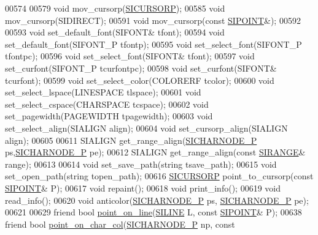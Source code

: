 \begin{DoxyCode}
00574 
00579     \textcolor{keywordtype}{void} mov\_cursorp(\hyperlink{class_s_i_c_h_a_r_n_o_d_e}{SICURSORP});   
00585     \textcolor{keywordtype}{void} mov\_cursorp(SIDIRECT);
00591     \textcolor{keywordtype}{void} mov\_cursorp(\textcolor{keyword}{const} \hyperlink{struct_s_i_p_o_i_n_t}{SIPOINT}&);
00592     
00593     \textcolor{keywordtype}{void} set\_default\_font(SIFONT& tfont);   
00594     \textcolor{keywordtype}{void} set\_default\_font(SIFONT\_P tfontp); 
00595     \textcolor{keywordtype}{void} set\_select\_font(SIFONT\_P tfontpc); 
00596     \textcolor{keywordtype}{void} set\_select\_font(SIFONT& tfont);    
00597     \textcolor{keywordtype}{void} set\_curfont(SIFONT\_P tcurfontpc);  
00598     \textcolor{keywordtype}{void} set\_curfont(SIFONT& tcurfont);
00599     \textcolor{keywordtype}{void} set\_select\_color(COLORERF tcolor); 
00600     \textcolor{keywordtype}{void} set\_select\_lspace(LINESPACE tlspace);  
00601     \textcolor{keywordtype}{void} set\_select\_cspace(CHARSPACE tcspace);  
00602     \textcolor{keywordtype}{void} set\_pagewidth(PAGEWIDTH tpagewidth);   
00603     \textcolor{keywordtype}{void} set\_select\_align(SIALIGN align);   
00604     \textcolor{keywordtype}{void} set\_cursorp\_align(SIALIGN align);  
00605 
00611     SIALIGN get\_range\_align(\hyperlink{class_s_i_c_h_a_r_n_o_d_e}{SICHARNODE\_P} ps,\hyperlink{class_s_i_c_h_a_r_n_o_d_e}{SICHARNODE\_P} pe);   
00612     SIALIGN get\_range\_align(\textcolor{keyword}{const} \hyperlink{struct_s_i_r_a_n_g_e}{SIRANGE}& range);   
00613 
00614     \textcolor{keywordtype}{void} set\_save\_path(\textcolor{keywordtype}{string} tsave\_path);  
00615     \textcolor{keywordtype}{void} set\_open\_path(\textcolor{keywordtype}{string} topen\_path);  
00616     \hyperlink{class_s_i_c_h_a_r_n_o_d_e}{SICURSORP} point\_to\_cursorp(\textcolor{keyword}{const} \hyperlink{struct_s_i_p_o_i_n_t}{SIPOINT}& P);   
00617     \textcolor{keywordtype}{void} repaint(); 
00618     \textcolor{keywordtype}{void} print\_info();  
00619     \textcolor{keywordtype}{void} read\_info();   
00620     \textcolor{keywordtype}{void} anticolor(\hyperlink{class_s_i_c_h_a_r_n_o_d_e}{SICHARNODE\_P} ps, \hyperlink{class_s_i_c_h_a_r_n_o_d_e}{SICHARNODE\_P} pe);   
00621 
00629     \textcolor{keyword}{friend} \textcolor{keywordtype}{bool} \hyperlink{kernal_8h_ae39165f0f00583edee6fe18ea6bdf5e3}{point\_on\_line}(\hyperlink{struct_s_i_r_a_n_g_e}{SILINE} L, \textcolor{keyword}{const} \hyperlink{struct_s_i_p_o_i_n_t}{SIPOINT}& P);
00638     \textcolor{keyword}{friend} \textcolor{keywordtype}{bool} \hyperlink{kernal_8h_a98cfecde826e07d0286c4e279554d1fa}{point\_on\_char\_col}(\hyperlink{class_s_i_c_h_a_r_n_o_d_e}{SICHARNODE\_P} np, \textcolor{keyword}{const} 

\end{DoxyCode}
